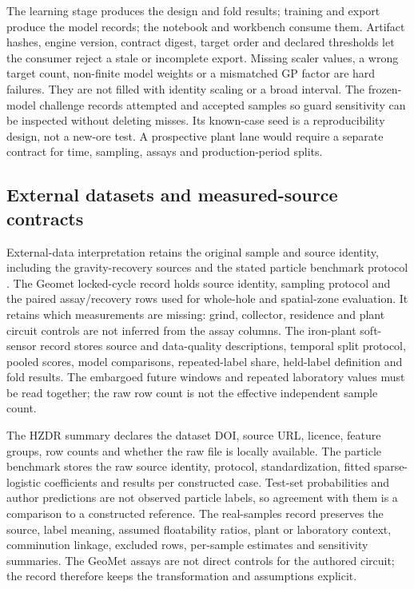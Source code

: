 \documentclass[10pt]{article}
\begin{document}
The learning stage produces the design and fold results; training and
export produce the model records; the notebook and workbench consume
them. Artifact hashes, engine version, contract digest, target order and
declared thresholds let the consumer reject a stale or incomplete
export. Missing scaler values, a wrong target count, non-finite model
weights or a mismatched GP factor are hard failures. They are not filled
with identity scaling or a broad interval. The frozen-model challenge
records attempted and accepted samples so guard sensitivity can be
inspected without deleting misses. Its known-case seed is a
reproducibility design, not a new-ore test. A prospective plant lane
would require a separate contract for time, sampling, assays and
production-period splits.

\subsection{External datasets and measured-source
contracts}\label{external-datasets-and-measured-source-contracts}

\label{contract-external-data}

External-data interpretation retains the original sample and source
identity, including the gravity-recovery sources and the stated particle
benchmark protocol \cite{laplante2005,laplantestaunton,pereira2021}. The
Geomet locked-cycle record holds source identity, sampling protocol and
the paired assay/recovery rows used for whole-hole and spatial-zone
evaluation. It retains which measurements are missing: grind, collector,
residence and plant circuit controls are not inferred from the assay
columns. The iron-plant soft-sensor record stores source and
data-quality descriptions, temporal split protocol, pooled scores, model
comparisons, repeated-label share, held-label definition and fold
results. The embargoed future windows and repeated laboratory values
must be read together; the raw row count is not the effective
independent sample count.

The HZDR summary declares the dataset DOI, source URL, licence, feature
groups, row counts and whether the raw file is locally available. The
particle benchmark stores the raw source identity, protocol,
standardization, fitted sparse-logistic coefficients and results per
constructed case. Test-set probabilities and author predictions are not
observed particle labels, so agreement with them is a comparison to a
constructed reference. The real-samples record preserves the source,
label meaning, assumed floatability ratios, plant or laboratory context,
comminution linkage, excluded rows, per-sample estimates and sensitivity
summaries. The GeoMet assays are not direct controls for the authored
circuit; the record therefore keeps the transformation and assumptions
explicit.
\end{document}
